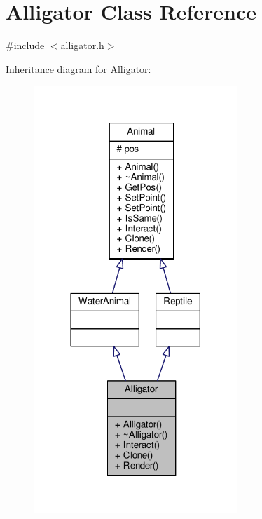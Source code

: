 \hypertarget{classAlligator}{}\section{Alligator Class Reference}
\label{classAlligator}


{\ttfamily \#include $<$alligator.\+h$>$}



Inheritance diagram for Alligator\+:
\nopagebreak
\begin{figure}[H]
\begin{center}
\leavevmode
\includegraphics[width=218pt]{classAlligator__inherit__graph}
\end{center}
\end{figure}


